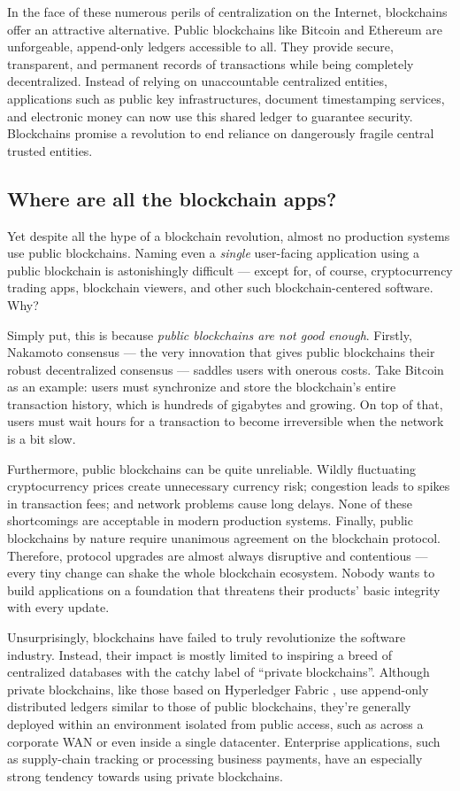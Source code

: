 \documentclass[headinclude,12pt]{scrbook}
\begin{document}
In the face of these numerous perils of centralization on the Internet, blockchains offer an attractive alternative. Public blockchains like Bitcoin \cite{nakamoto2008bitcoin} and Ethereum \cite{wood2014ethereum} are unforgeable, append-only ledgers accessible to all. They provide secure, transparent, and permanent records of transactions while being completely decentralized. Instead of relying on unaccountable centralized entities, applications such as public key infrastructures, document timestamping services, and electronic money can now use this shared ledger to guarantee security. Blockchains promise a revolution to end reliance on dangerously fragile central trusted entities.


\subsection{Where are all the blockchain apps?}

Yet despite all the hype of a blockchain revolution, almost no production systems use public blockchains. Naming even a \emph{single} user-facing application using a public blockchain is astonishingly difficult --- except for, of course, cryptocurrency trading apps, blockchain viewers, and other such blockchain-centered software. Why?

Simply put, this is because \emph{public blockchains are not good enough}. Firstly, Nakamoto consensus --- the very innovation that gives public blockchains their robust decentralized consensus --- saddles users with onerous costs. Take Bitcoin as an example: users must synchronize and store the blockchain's entire transaction history, which is hundreds of gigabytes and growing. On top of that, users must wait hours for a transaction to become irreversible when the network is a bit slow.

Furthermore, public blockchains can be quite unreliable. Wildly fluctuating cryptocurrency prices create unnecessary currency risk; congestion leads to spikes in transaction fees; and network problems cause long delays. None of these shortcomings are acceptable in modern production systems. Finally, public blockchains by nature require unanimous agreement on the blockchain protocol. Therefore, protocol upgrades are almost always disruptive and contentious --- every tiny change can shake the whole blockchain ecosystem. Nobody wants to build applications on a foundation that threatens their products' basic integrity with every update.

Unsurprisingly, blockchains have failed to truly revolutionize the software industry. Instead, their impact is mostly limited to inspiring a breed of centralized databases with the catchy label of ``private blockchains''. Although private blockchains, like those based on Hyperledger Fabric \cite{cachin2016architecture}, use append-only distributed ledgers similar to those of public blockchains, they're generally deployed within an environment isolated from public access, such as across a corporate WAN or even inside a single datacenter. Enterprise applications, such as supply-chain tracking or processing business payments, have an especially strong tendency towards using private blockchains.
\end{document}
